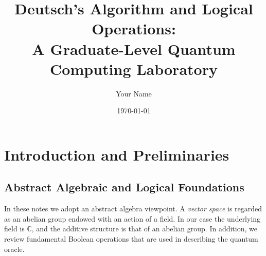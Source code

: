 \documentclass[11pt,oneside]{book}
\theoremstyle{remark}
\begin{document}
	
	\frontmatter
	\title{Deutsch's Algorithm and Logical Operations:\\ 
		A Graduate-Level Quantum Computing Laboratory}
	\author{Your Name}
	\date{\today}
	\maketitle
	\tableofcontents
	
	\mainmatter
	
	\chapter{Introduction and Preliminaries}
	\section{Abstract Algebraic and Logical Foundations}
	
	In these notes we adopt an abstract algebra viewpoint. A \emph{vector space} is regarded as an abelian group endowed with an action of a field. In our case the underlying field is $\mathbb{C}$, and the additive structure is that of an abelian group. In addition, we review fundamental Boolean operations that are used in describing the quantum oracle.
	
\end{document}

